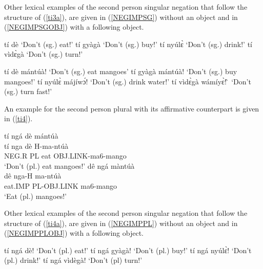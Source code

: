 Other lexical examples of the second person singular negation that follow the structure of (\ref{ti3a}), are given in (\ref{NEGIMPSG}) without an object and in (\ref{NEGIMPSGOBJ}) with a following object.

\begin{exe}
\ex\label{NEGIMPSG}
\begin{xlist}
\ex tí dè `Don't (sg.) eat!'
\ex tí gyàgà `Don't (sg.) buy!'
\ex tí nyúlɛ̀ `Don't (sg.) drink!' 
\ex tí vìdɛ̀gà `Don't (sg.) turn!' 
\end{xlist}
\end{exe}

\begin{exe}
\ex\label{NEGIMPSGOBJ}
\begin{xlist}
\ex tí dè mántúà!  `Don't (sg.) eat mangoes'
\ex tí gyàgà mántúà!  `Don't (sg.) buy mangoes!'
\ex tí nyúlɛ̀ májíwɔ́!  `Don't (sg.) drink water!'
\ex tí vìdɛ̀gà wámíyɛ̀! ̀ `Don't (sg.) turn fast!' 
\end{xlist}
\end{exe}

An example for the second person plural with its affirmative counterpart is given in (\ref{ti4}).

\begin{exe}
\ex\label{ti4}
\begin{xlist}
\ex\label{ti4a}
  \glll   tí ngá dè mántúà \\
          tí nga dè H-ma-ntúà  \\
         NEG.R PL eat OBJ.LINK-ma6-mango   \\
    \trans `Don't (pl.) eat mangoes!'
\ex\label{ti4b}
  \glll   dê ngá màntúà \\
          dê nga-H ma-ntúà  \\
         eat.IMP PL-OBJ.LINK ma6-mango   \\
    \trans `Eat (pl.) mangoes!'
\end{xlist}
\end{exe}

Other lexical examples of the second person singular negation that follow the structure of (\ref{ti4a}), are given in (\ref{NEGIMPPL}) without an object and in (\ref{NEGIMPPLOBJ}) with a following object.


\begin{exe}
\ex\label{NEGIMPPL}
\begin{xlist}
\ex tí ngá dè! `Don't (pl.) eat!'
\ex tí ngá gyàgà! `Don't (pl.) buy!'
\ex tí ngá nyúlɛ̀! `Don't (pl.) drink!' 
\ex tí ngá vìdègà! `Don't (pl) turn!' 
\end{xlist}
\end{exe}


